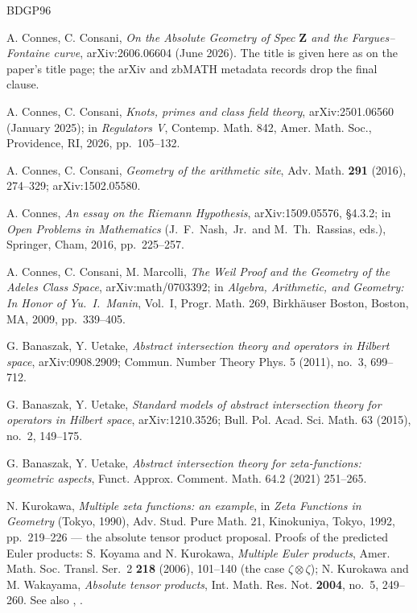 \documentclass[11pt]{article}
\theoremstyle{definition}
\theoremstyle{remark}
\newcommand{\Z}{\mathbf{Z}}
\begin{document}
\begin{thebibliography}{BDGP96}

 A. Connes, C. Consani, \emph{On the Absolute Geometry
of Spec $\Z$ and the Fargues--Fontaine curve}, arXiv:2606.06604 (June
2026). The title is given here as on the paper's title page; the arXiv and
zbMATH metadata records drop the final clause.

 A. Connes, C. Consani, \emph{Knots, primes and class
field theory}, arXiv:2501.06560 (January 2025); in \emph{Regulators V},
Contemp. Math. 842, Amer. Math. Soc., Providence, RI, 2026, pp.~105--132.

 A. Connes, C. Consani, \emph{Geometry of the
arithmetic site}, Adv. Math. \textbf{291} (2016), 274--329;
arXiv:1502.05580.

 A. Connes, \emph{An essay on the Riemann Hypothesis},
arXiv:1509.05576, \S4.3.2; in \emph{Open Problems in Mathematics}
(J.~F.~Nash,~Jr.\ and M.~Th.~Rassias, eds.), Springer, Cham, 2016,
pp.~225--257.

 A. Connes, C. Consani, M. Marcolli, \emph{The Weil
Proof and the Geometry of the Adeles Class Space}, arXiv:math/0703392;
in \emph{Algebra, Arithmetic, and Geometry: In Honor of Yu.~I.~Manin},
Vol.~I, Progr. Math. 269, Birkh\"auser Boston, Boston, MA, 2009,
pp.~339--405.

 G. Banaszak, Y. Uetake, \emph{Abstract intersection
theory and operators in Hilbert space}, arXiv:0908.2909; Commun. Number
Theory Phys. 5 (2011), no.~3, 699--712.

 G. Banaszak, Y. Uetake, \emph{Standard models of
abstract intersection theory for operators in Hilbert space},
arXiv:1210.3526; Bull. Pol. Acad. Sci. Math. 63 (2015), no.~2, 149--175.

 G. Banaszak, Y. Uetake, \emph{Abstract intersection
theory for zeta-functions: geometric aspects}, Funct. Approx.
Comment. Math. 64.2 (2021) 251--265.

 N. Kurokawa, \emph{Multiple zeta functions: an
example}, in \emph{Zeta Functions in Geometry} (Tokyo, 1990), Adv. Stud.
Pure Math. 21, Kinokuniya, Tokyo, 1992, pp.~219--226 --- the absolute
tensor product proposal. Proofs of the predicted Euler products:
S. Koyama and N. Kurokawa, \emph{Multiple Euler products}, Amer. Math.
Soc. Transl. Ser.~2 \textbf{218} (2006), 101--140 (the case
$\zeta \otimes \zeta$); N. Kurokawa and M. Wakayama, \emph{Absolute
tensor products}, Int. Math. Res. Not. \textbf{2004}, no.~5, 249--260.
See also \cite{Ak09}, \cite{Ta20}.


\end{thebibliography}
\end{document}
